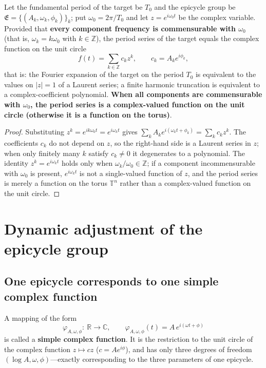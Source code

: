 \begin{theorem}\label{thm:ps_series_complex_function}
Let the fundamental period of the target be $T_0$ and the epicycle group be $\mathfrak{E}=\{(A_k,\omega_k,\phi_k)\}_k$; put $\omega_0=2\pi/T_0$ and let $z=e^{i\omega_0t}$ be the complex variable. Provided that \textbf{every component frequency is commensurable with $\omega_0$} (that is, $\omega_k=k\omega_0$ with $k\in\mathbb Z$), the period series of the target equals the complex function on the unit circle
\[
f(t)=\sum_{k\in\mathbb{Z}}c_kz^k,\qquad c_k=A_ke^{i\phi_k},
\]
that is: the Fourier expansion of the target on the period $T_0$ is equivalent to the values on $|z|=1$ of a Laurent series; a finite harmonic truncation is equivalent to a complex-coefficient polynomial. \textbf{When all components are commensurable with $\omega_0$, the period series is a complex-valued function on the unit circle (otherwise it is a function on the torus)}.
\end{theorem}

\begin{proof}
Substituting $z^k=e^{ik\omega_0t}=e^{i\omega_kt}$ gives $\sum_kA_ke^{i(\omega_kt+\phi_k)}=\sum_kc_kz^k$. The coefficients $c_k$ do not depend on $z$, so the right-hand side is a Laurent series in $z$; when only finitely many $k$ satisfy $c_k\neq0$ it degenerates to a polynomial. The identity $z^k=e^{i\omega_kt}$ holds only when $\omega_k/\omega_0\in\mathbb Z$; if a component incommensurable with $\omega_0$ is present, $e^{i\omega_kt}$ is not a single-valued function of $z$, and the period series is merely a function on the torus $\mathbb{T}^n$ rather than a complex-valued function on the unit circle.
\end{proof}

\section{Dynamic adjustment of the epicycle group}\label{sec:ps_adaptive}

\subsection{One epicycle corresponds to one simple complex function}

\begin{definition}\label{def:ps_single_epicycle_function}
A mapping of the form
\[
\varphi_{A,\omega,\phi}:\ \mathbb{R}\to\mathbb{C},\qquad
\varphi_{A,\omega,\phi}(t)=A\,e^{i(\omega t+\phi)}
\]
is called a \textbf{simple complex function}. It is the restriction to the unit circle of the complex function $z\mapsto cz$ ($c=Ae^{i\phi}$), and has only three degrees of freedom $(\log A,\omega,\phi)$---exactly corresponding to the three parameters of one epicycle.
\end{definition}

